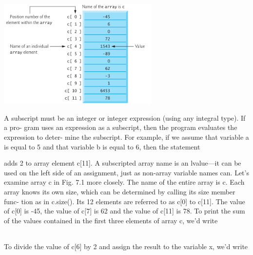 \documentclass[10pt]{beamer}
\begin{document}
\begin{frame}
	
	\begin{center}
		\includegraphics[width=8cm]{./.images/.img7-1.png}
	\end{center}
	
	A subscript must be an integer or integer expression (using any integral type). If a pro-
	gram uses an expression as a subscript, then the program evaluates the expression to deter-
	mine the subscript. For example, if we assume that variable a is equal to 5 and that variable
	b is equal to 6, then the statement
	
	
	
	
\end{frame}

\begin{frame}
	adds 2 to array element c[11]. A subscripted array name is an lvalue—it can be used on
	the left side of an assignment, just as non-array variable names can.
	Let’s examine array c in Fig. 7.1 more closely. The name of the entire array is c.
	Each array knows its own size, which can be determined by calling its size member func-
	tion as in c.size(). Its 12 elements are referred to as c[0] to c[11]. The value of c[0] is
	-45, the value of c[7] is 62 and the value of c[11] is 78. To print the sum of the values
	contained in the first three elements of array c, we’d write
	
	
	\\
	To divide the value of c[6] by 2 and assign the result to the variable x, we’d write
	
\end{frame}
\end{document}
